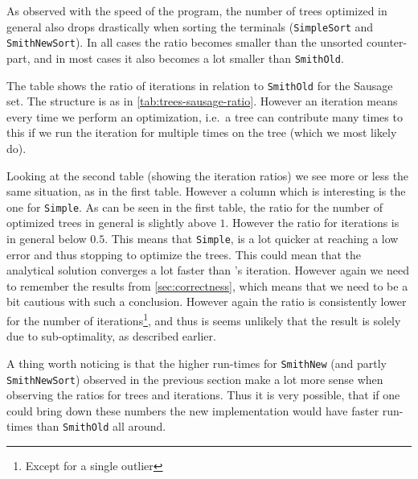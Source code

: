 As observed with the speed of the program, the number of trees optimized in
general also drops drastically when sorting the terminals (\texttt{SimpleSort}
and \texttt{SmithNewSort}). In all cases the ratio becomes smaller than the
unsorted counter-part, and in most cases it also becomes a lot smaller than
\texttt{SmithOld}.

\begin{table}[htbp]
  \centering
  
  \caption[Iteration ratio for Sausage]{The table shows the ratio of iterations
    in relation to \texttt{SmithOld} for the Sausage set. The structure is as
    in \cref{tab:trees-sausage-ratio}. However an iteration means every time we
    perform an optimization, i.e.\ a tree can contribute many times to this if
    we run the iteration for multiple times on the tree (which we most likely
    do).\label{tab:iterations-sausage-ratio}}
\end{table}

Looking at the second table (showing the iteration ratios) we see more or less
the same situation, as in the first table. However a column which is interesting
is the one for \texttt{Simple}. As can be seen in the first table, the ratio for
the number of optimized trees in general is slightly above $1$. However the
ratio for iterations is in general below $0.5$. This means that \texttt{Simple},
is a lot quicker at reaching a low error and thus stopping to optimize the
trees. This could mean that the analytical solution converges a lot faster than
\citeauthor{smith1992}'s iteration. However again we need to remember the results
from \cref{sec:correctness}, which means that we need to be a bit cautious with
such a conclusion. However again the ratio is consistently lower for the number
of iterations\footnote{Except for a single outlier}, and thus is seems unlikely
that the result is solely due to sub-optimality, as described earlier.

A thing worth noticing is that the higher run-times for \texttt{SmithNew} (and
partly \texttt{SmithNewSort}) observed in the previous section make a lot more
sense when observing the ratios for trees and iterations. Thus it is very
possible, that if one could bring down these numbers the new implementation
would have faster run-times than \texttt{SmithOld} all around.

